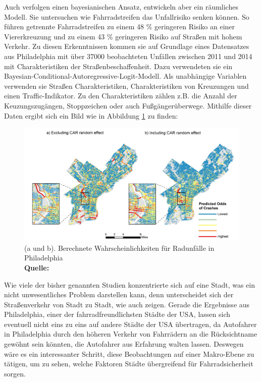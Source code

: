 \documentclass[a4paper,12pt]{thesis}
\newcommand*{\captionsource}[2]{%
	\caption[{#1}]{%
		#1%
		\\\hspace{\linewidth}%
		\textbf{Quelle:} #2%
	}%
}
\begin{document}
Auch \cite{Kondo2018} verfolgen einen bayesianischen Ansatz, entwickeln aber ein räumliches Modell. Sie untersuchen wie Fahrradstreifen das Unfallrisiko senken können. So führen getrennte Fahrradstreifen zu einem 48 \% geringeren Risiko an einer Viererkreuzung und zu einem 43 \% geringeren Risiko auf Straßen mit hohem Verkehr. Zu diesen Erkenntnissen kommen sie auf Grundlage eines Datensatzes aus Philadelphia mit über 37000 beobachteten Unfällen zwischen 2011 und 2014 mit Charakteristiken der Straßenbeschaffenheit. Dazu verwendeten sie ein Bayesian-Conditional-Autoregressive-Logit-Modell. Als unabhängige Variablen verwenden sie Straßen Charakteristiken, Charakteristiken von Kreuzungen und einen Traffic-Indikator. Zu den Charakteristiken zählen z.B. die Anzahl der Keuzungszugängen, Stoppzeichen oder auch Fußgängerüberwege. Mithilfe dieser Daten ergibt sich ein Bild wie in Abbildung \ref{kondor} zu finden:
\begin{figure}[!ht]
	\centering
	\includegraphics[width=\textwidth]{Plots/Kondor.png}
	\captionsource{(a und b). Berechnete Wahrscheinlichkeiten für Radunfälle in Philadelphia}{
		\cite{Kondo2018}
	}
	\label{kondor}
\end{figure}
Wie viele der bisher genannten Studien konzentrierte sich \cite{Kondo2018} auf eine Stadt, was ein nicht unwesentliches Problem darstellen kann, denn unterscheidet sich der Straßenverkehr von Stadt zu Stadt, wie auch \cite{Goldmann2021} zeigen. Gerade die Ergebnisse aus Philadelphia, einer der fahrradfreundlichsten Städte der USA, lassen sich eventuell nicht eins zu eins auf andere Städte der USA übertragen, da Autofahrer in Philadelphia durch den höheren Verkehr von Fahrrädern an die Rücksichtname gewöhnt sein könnten, die Autofahrer aus Erfahrung walten lassen. Deswegen wäre es ein interessanter Schritt, diese Beobachtungen auf einer Makro-Ebene zu tätigen, um zu sehen, welche Faktoren Städte übergreifend für Fahrradsicherheit sorgen.\\
\end{document}
